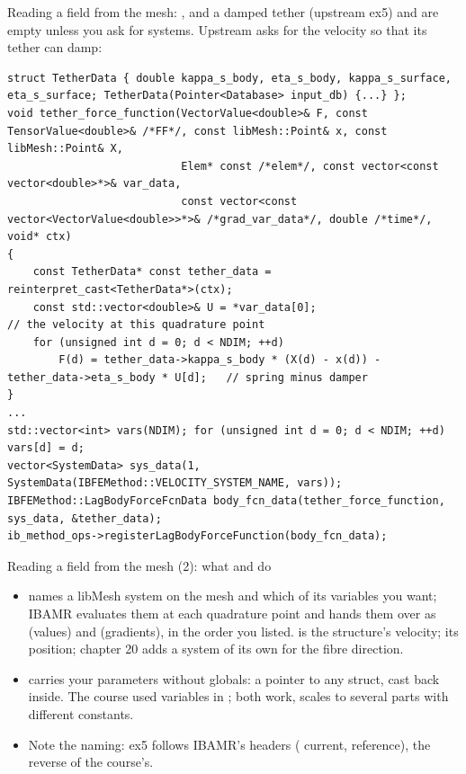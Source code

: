 \documentclass[aspectratio=169,11pt]{beamer}
\begin{document}
\begin{frame}[fragile]{Reading a field from the mesh: , and a damped tether (upstream ex5)}
\label{fr:sysdata}
\footnotesize
{} and  are empty unless you ask for systems. Upstream  asks for the velocity so that its tether can damp:
\begin{lstlisting}[style=cpptiny]
struct TetherData { double kappa_s_body, eta_s_body, kappa_s_surface, eta_s_surface; TetherData(Pointer<Database> input_db) {...} };
void tether_force_function(VectorValue<double>& F, const TensorValue<double>& /*FF*/, const libMesh::Point& x, const libMesh::Point& X,
                           Elem* const /*elem*/, const vector<const vector<double>*>& var_data,
                           const vector<const vector<VectorValue<double>>*>& /*grad_var_data*/, double /*time*/, void* ctx)
{
    const TetherData* const tether_data = reinterpret_cast<TetherData*>(ctx);
    const std::vector<double>& U = *var_data[0];                         // the velocity at this quadrature point
    for (unsigned int d = 0; d < NDIM; ++d)
        F(d) = tether_data->kappa_s_body * (X(d) - x(d)) - tether_data->eta_s_body * U[d];   // spring minus damper
}
...
std::vector<int> vars(NDIM); for (unsigned int d = 0; d < NDIM; ++d) vars[d] = d;
vector<SystemData> sys_data(1, SystemData(IBFEMethod::VELOCITY_SYSTEM_NAME, vars));
IBFEMethod::LagBodyForceFcnData body_fcn_data(tether_force_function, sys_data, &tether_data);
ib_method_ops->registerLagBodyForceFunction(body_fcn_data);
\end{lstlisting}
\end{frame}

\begin{frame}{Reading a field from the mesh (2): what  and  do}
\label{fr:sysdata2}
\footnotesize
\begin{itemize}
  \item {} names a libMesh system on the mesh and which of its variables you want; IBAMR evaluates them at each quadrature point and hands them over as  (values) and  (gradients), in the order you listed.  is the structure's velocity;  its position; chapter 20 adds a system of its own for the fibre direction.
  \item {} carries your parameters without globals: a pointer to any struct, cast back inside. The course used  variables in ; both work,  scales to several parts with different constants.
  \item Note the naming: ex5 follows IBAMR's headers ( current,  reference), the reverse of the course's.
\end{itemize}
\end{frame}
\end{document}
